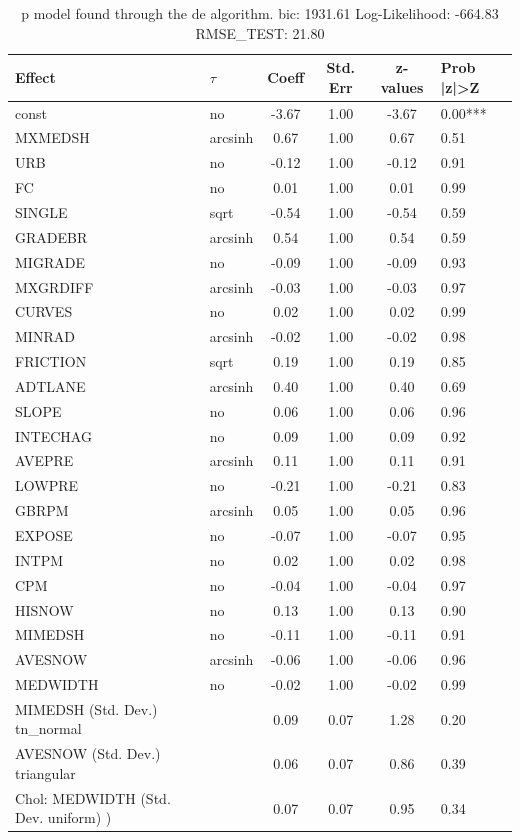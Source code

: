 \begin{table}
	\caption{p model found through the de algorithm. bic: 1931.61 Log-Likelihood: -664.83 RMSE_TEST: 21.80}
	\begin{center}
		\begin{tabular}{|l|l|c|c|c|l|}
			\hline
			Effect & $\tau$ & Coeff & Std. Err & z-values & Prob |z|>Z \\
			\hline
			const & no & -3.67 & 1.00 & -3.67 & 0.00*** \\
			\hline
			MXMEDSH & arcsinh & 0.67 & 1.00 & 0.67 & 0.51 \\
			\hline
			URB & no & -0.12 & 1.00 & -0.12 & 0.91 \\
			\hline
			FC & no & 0.01 & 1.00 & 0.01 & 0.99 \\
			\hline
			SINGLE & sqrt & -0.54 & 1.00 & -0.54 & 0.59 \\
			\hline
			GRADEBR & arcsinh & 0.54 & 1.00 & 0.54 & 0.59 \\
			\hline
			MIGRADE & no & -0.09 & 1.00 & -0.09 & 0.93 \\
			\hline
			MXGRDIFF & arcsinh & -0.03 & 1.00 & -0.03 & 0.97 \\
			\hline
			CURVES & no & 0.02 & 1.00 & 0.02 & 0.99 \\
			\hline
			MINRAD & arcsinh & -0.02 & 1.00 & -0.02 & 0.98 \\
			\hline
			FRICTION & sqrt & 0.19 & 1.00 & 0.19 & 0.85 \\
			\hline
			ADTLANE & arcsinh & 0.40 & 1.00 & 0.40 & 0.69 \\
			\hline
			SLOPE & no & 0.06 & 1.00 & 0.06 & 0.96 \\
			\hline
			INTECHAG & no & 0.09 & 1.00 & 0.09 & 0.92 \\
			\hline
			AVEPRE & arcsinh & 0.11 & 1.00 & 0.11 & 0.91 \\
			\hline
			LOWPRE & no & -0.21 & 1.00 & -0.21 & 0.83 \\
			\hline
			GBRPM & arcsinh & 0.05 & 1.00 & 0.05 & 0.96 \\
			\hline
			EXPOSE & no & -0.07 & 1.00 & -0.07 & 0.95 \\
			\hline
			INTPM & no & 0.02 & 1.00 & 0.02 & 0.98 \\
			\hline
			CPM & no & -0.04 & 1.00 & -0.04 & 0.97 \\
			\hline
			HISNOW & no & 0.13 & 1.00 & 0.13 & 0.90 \\
			\hline
			MIMEDSH & no & -0.11 & 1.00 & -0.11 & 0.91 \\
			\hline
			AVESNOW & arcsinh & -0.06 & 1.00 & -0.06 & 0.96 \\
			\hline
			MEDWIDTH & no & -0.02 & 1.00 & -0.02 & 0.99 \\
			\hline
			MIMEDSH (Std. Dev.) tn_normal &  & 0.09 & 0.07 & 1.28 & 0.20 \\
			\hline
			AVESNOW (Std. Dev.) triangular &  & 0.06 & 0.07 & 0.86 & 0.39 \\
			\hline
			 Chol: MEDWIDTH (Std. Dev. uniform) ) &  & 0.07 & 0.07 & 0.95 & 0.34 \\
			\hline
		\end{tabular}
	\end{center}
\end{table}